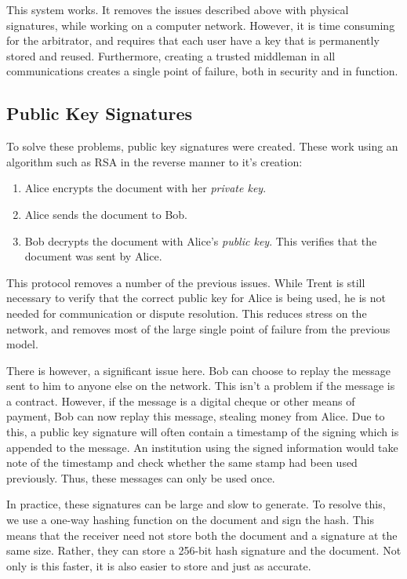 			This system works. 
			It removes the issues described above with physical signatures, while working on a computer network. 
			However, it is time consuming for the arbitrator, and requires that each user have a key that is permanently stored and reused. 
			Furthermore, creating a trusted middleman in all communications creates a single point of failure, both in security and in function. 

		\subsection{Public Key Signatures}
			To solve these problems, public key signatures were created. 
			These work using an algorithm such as RSA in the reverse manner to it's creation:
			\begin{enumerate}
				\item Alice encrypts the document with her \emph{private key}.
				\item Alice sends the document to Bob. 
				\item Bob decrypts the document with Alice's \emph{public key}. 
					This verifies that the document was sent by Alice. 
			\end{enumerate}

			This protocol removes a number of the previous issues. 
			While Trent is still necessary to verify that the correct public key for Alice is being used, he is not needed for communication or dispute resolution. 
			This reduces stress on the network, and removes most of the large single point of failure from the previous model. 

			There is however, a significant issue here. 
			Bob can choose to replay the message sent to him to anyone else on the network. 
			This isn't a problem if the message is a contract. 
			However, if the message is a digital cheque or other means of payment, Bob can now replay this message, stealing money from Alice. 
			Due to this, a public key signature will often contain a timestamp of the signing which is appended to the message. 
			An institution using the signed information would take note of the timestamp and check whether the same stamp had been used previously. 
			Thus, these messages can only be used once. 

			In practice, these signatures can be large and slow to generate. 
			To resolve this, we use a one-way hashing function on the document and sign the hash. 
			This means that the receiver need not store both the document and a signature at the same size. 
			Rather, they can store a 256-bit hash signature and the document. 
			Not only is this faster, it is also easier to store and just as accurate. 
			
